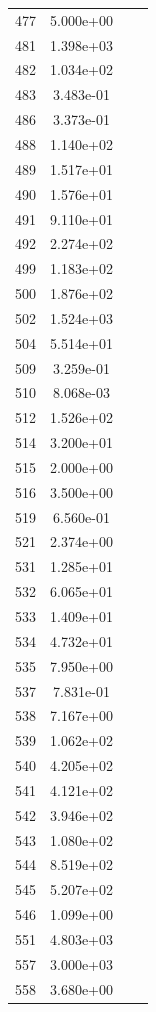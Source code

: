 \documentclass[12pt]{article}
\begin{document}
\begin{longtable}{@{}cccc@{}}
477 & 5.000e+00 &  &  \\
481 & 1.398e+03 &  &  \\
482 & 1.034e+02 &  &  \\
483 & 3.483e-01 &  &  \\
486 & 3.373e-01 &  &  \\
488 & 1.140e+02 &  &  \\
489 & 1.517e+01 &  &  \\
490 & 1.576e+01 &  &  \\
491 & 9.110e+01 &  &  \\
492 & 2.274e+02 &  &  \\
499 & 1.183e+02 &  &  \\
500 & 1.876e+02 &  &  \\
502 & 1.524e+03 &  &  \\
504 & 5.514e+01 &  &  \\
509 & 3.259e-01 &  &  \\
510 & 8.068e-03 &  &  \\
512 & 1.526e+02 &  &  \\
514 & 3.200e+01 &  &  \\
515 & 2.000e+00 &  &  \\
516 & 3.500e+00 &  &  \\
519 & 6.560e-01 &  &  \\
521 & 2.374e+00 &  &  \\
531 & 1.285e+01 &  &  \\
532 & 6.065e+01 &  &  \\
533 & 1.409e+01 &  &  \\
534 & 4.732e+01 &  &  \\
535 & 7.950e+00 &  &  \\
537 & 7.831e-01 &  &  \\
538 & 7.167e+00 &  &  \\
539 & 1.062e+02 &  &  \\
540 & 4.205e+02 &  &  \\
541 & 4.121e+02 &  &  \\
542 & 3.946e+02 &  &  \\
543 & 1.080e+02 &  &  \\
544 & 8.519e+02 &  &  \\
545 & 5.207e+02 &  &  \\
546 & 1.099e+00 &  &  \\
551 & 4.803e+03 &  &  \\
557 & 3.000e+03 &  &  \\
558 & 3.680e+00 &  &  \\

\end{longtable}
\end{document}

